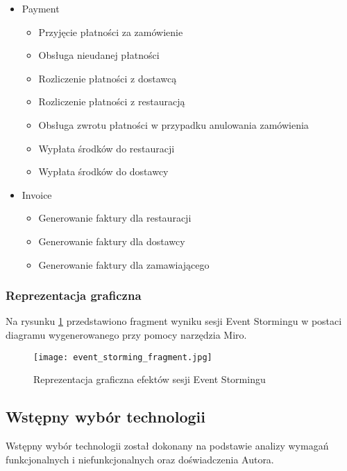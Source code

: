 \begin{itemize}
    \item Payment
    \begin{itemize}
        \item Przyjęcie płatności za zamówienie
        \item Obsługa nieudanej płatności
        \item Rozliczenie płatności z dostawcą
        \item Rozliczenie płatności z restauracją
        \item Obsługa zwrotu płatności w przypadku anulowania zamówienia
        \item Wypłata środków do restauracji
        \item Wypłata środków do dostawcy
    \end{itemize}
    
    \item Invoice
    \begin{itemize}
        \item Generowanie faktury dla restauracji
        \item Generowanie faktury dla dostawcy
        \item Generowanie faktury dla zamawiającego
    \end{itemize}
\end{itemize}


\subsubsection{Reprezentacja graficzna}

Na rysunku \ref{fig:event-storming} przedstawiono fragment wyniku sesji Event Stormingu w postaci diagramu wygenerowanego przy pomocy narzędzia Miro.

\begin{figure}[!h]
    \centering \texttt{[image: event\_storming\_fragment.jpg]}
    \caption{Reprezentacja graficzna efektów sesji Event Stormingu}
    \label{fig:event-storming}
\end{figure}



\subsection{Wstępny wybór technologii}

Wstępny wybór technologii został dokonany na podstawie analizy wymagań funkcjonalnych i niefunkcjonalnych oraz doświadczenia Autora. 

